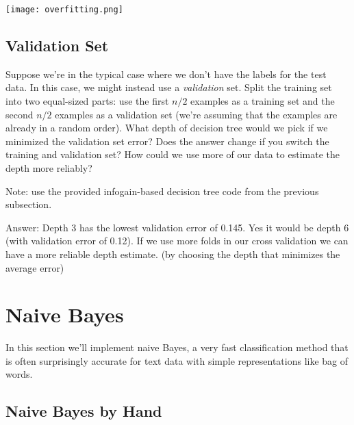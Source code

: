 \documentclass{article}
\def\ans#1{\par\gre{Answer: #1}}
\def\blu#1{{\color{blu}#1}}
\def\gre#1{{\color{gre}#1}}
\begin{document}
\texttt{[image: overfitting.png]}


\subsection{Validation Set}

Suppose we're in the typical case where we don't have the labels for the test data. In this case, we might instead use a \emph{validation} set. Split the training set into two equal-sized parts: use the first $n/2$ examples as a training set and the second $n/2$ examples as a validation set (we're assuming that the examples are already in a random order). \blu{What depth of decision tree would we pick if we minimized the validation set error? Does the answer change if you switch the training and validation set? How could we use more of our data to  estimate the depth more reliably?}

Note: use the provided infogain-based decision tree code from the previous subsection.

\ans{
    Depth 3 has the lowest validation error of 0.145. Yes it would be depth 6 (with validation error of 0.12). If we use more folds in our cross validation we can have a more reliable depth estimate. (by choosing the depth that minimizes the average error)
}

\section{Naive Bayes}

In this section we'll implement naive Bayes, a very fast classification method that is often surprisingly accurate for text data with simple representations like bag of words.


\subsection{Naive Bayes by Hand}
\end{document}
